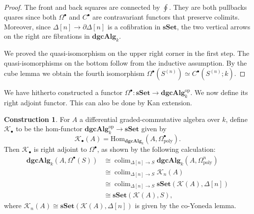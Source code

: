 \documentclass[psamsfonts]{amsart}
\theoremstyle{definition}
\newtheorem{con}{Construction}[section]
\newcommand{\sSet}{\mathbf{sSet}}
\newcommand{\dgcAlg}{\mathbf{dgcAlg}}
\newcommand{\Hom}{\mathrm{Hom}}
\DeclareMathOperator{\colim}{colim}
\numberwithin{equation}{section}
\begin{document}
\begin{proof}
The front and back squares are connected by $\oint$. They are both pullbacks quares since both $\Omega^\bullet$ and $C^\bullet$ are contravariant functors that preserve colimits. Moreover, since $\Delta[n]\to\partial\Delta[n]$ is a cofibration in $\sSet$, the two vertical arrows on the right are fibrations in $\dgcAlg_k$.

We proved the quasi-isomorphism on the upper right corner in the first step. The quasi-isomorphisms on the bottom follow from the inductive assumption. By the cube lemma we obtain the fourth isomorphism $\Omega^\bullet(S^{(n)})\simeq C^\bullet(S^{(n)};k)$.
\end{proof}

We have hitherto constructed a functor $\Omega^\bullet:\sSet\to\dgcAlg^\textrm{op}_k$. We now define its right adjoint functor. This can also be done by Kan extension.

\begin{con}
For $A$ a differential graded-commutative algebra over $k$, define $\mathcal{K}_\bullet$ to be the hom-functor $\dgcAlg_k^\textrm{op}\to\sSet$ given by
\[\mathcal{K}_\bullet(A)=\Hom_{\dgcAlg_k}(A,\Omega^\bullet_\textrm{poly}).\]
Then $\mathcal{K}_\bullet$ is right adjoint to $\Omega^\bullet$, as shown by the following calculation:
\begin{align*}
\dgcAlg_k(A,\Omega^\bullet(S))&\cong\colim_{\Delta[n]\to S}\dgcAlg_k(A,\Omega^n_\textrm{poly})\\
&\cong\colim_{\Delta[n]\to S}\mathcal{K}_n(A)\\
&\cong\colim_{\Delta[n]\to S}\sSet(\mathcal{K}(A),\Delta[n])\\
&\cong\sSet(\mathcal{K}(A),S),
\end{align*}
where $\mathcal{K}_n(A)\cong\sSet(\mathcal{K}(A),\Delta[n])$ is given by the co-Yoneda lemma.
\end{con}
\end{document}
